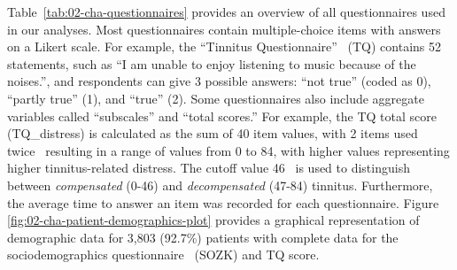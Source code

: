 \documentclass[
  oneside]{book}
\begin{document}
Table~\ref{tab:02-cha-questionnaires} provides an overview of all questionnaires used in our analyses.
Most questionnaires contain multiple-choice items with answers on a Likert scale. For example, the ``Tinnitus Questionnaire''~\autocite{GoebelHiller:TF1998} (TQ) contains 52 statements, such as ``I am unable to enjoy listening to music because of the noises.'', and respondents can give 3 possible answers: ``not true'' (coded as 0), ``partly true'' (1), and ``true'' (2).
Some questionnaires also include aggregate variables called ``subscales'' and ``total scores.''
For example, the TQ total score (TQ\_distress) is calculated as the sum of 40 item values, with 2 items used twice~\autocite{GoebelHiller:TF1998} resulting in a range of values from 0 to 84, with higher values representing higher tinnitus-related distress.
The cutoff value 46~\autocite{GoebelHiller:TF1998} is used to distinguish between \emph{compensated} (0-46) and \emph{decompensated} (47-84) tinnitus.
Furthermore, the average time to answer an item was recorded for each questionnaire.
Figure \ref{fig:02-cha-patient-demographics-plot} provides a graphical representation of demographic data for 3,803 (92.7\%) patients with complete data for the sociodemographics questionnaire~\autocite{brueggemann:sozk-reference} (SOZK) and TQ score.
\end{document}
